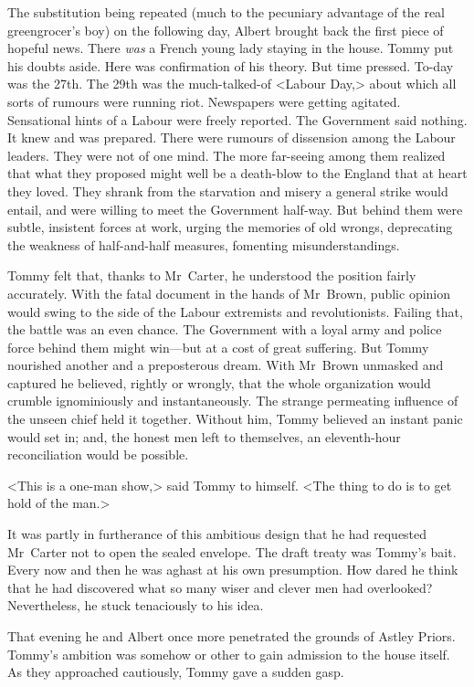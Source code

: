 The substitution being repeated (much to the pecuniary advantage of the real greengrocer's boy) on the following day, Albert brought back the first piece of hopeful news. There \emph{was} a French young lady staying in the house. Tommy put his doubts aside. Here was confirmation of his theory. But time pressed. To-day was the 27th. The 29th was the much-talked-of <Labour Day,> about which all sorts of rumours were running riot. Newspapers were getting agitated. Sensational hints of a Labour  were freely reported. The Government said nothing. It knew and was prepared. There were rumours of dissension among the Labour leaders. They were not of one mind. The more far-seeing among them realized that what they proposed might well be a death-blow to the England that at heart they loved. They shrank from the starvation and misery a general strike would entail, and were willing to meet the Government half-way. But behind them were subtle, insistent forces at work, urging the memories of old wrongs, deprecating the weakness of half-and-half measures, fomenting misunderstandings.

Tommy felt that, thanks to Mr~Carter, he understood the position fairly accurately. With the fatal document in the hands of Mr~Brown, public opinion would swing to the side of the Labour extremists and revolutionists. Failing that, the battle was an even chance. The Government with a loyal army and police force behind them might win—but at a cost of great suffering. But Tommy nourished another and a preposterous dream. With Mr~Brown unmasked and captured he believed, rightly or wrongly, that the whole organization would crumble ignominiously and instantaneously. The strange permeating influence of the unseen chief held it together. Without him, Tommy believed an instant panic would set in; and, the honest men left to themselves, an eleventh-hour reconciliation would be possible.

<This is a one-man show,> said Tommy to himself. <The thing to do is to get hold of the man.>

It was partly in furtherance of this ambitious design that he had requested Mr~Carter not to open the sealed envelope. The draft treaty was Tommy's bait. Every now and then he was aghast at his own presumption. How dared he think that he had discovered what so many wiser and clever men had overlooked? Nevertheless, he stuck tenaciously to his idea.

That evening he and Albert once more penetrated the grounds of Astley Priors. Tommy's ambition was somehow or other to gain admission to the house itself. As they approached cautiously, Tommy gave a sudden gasp.

